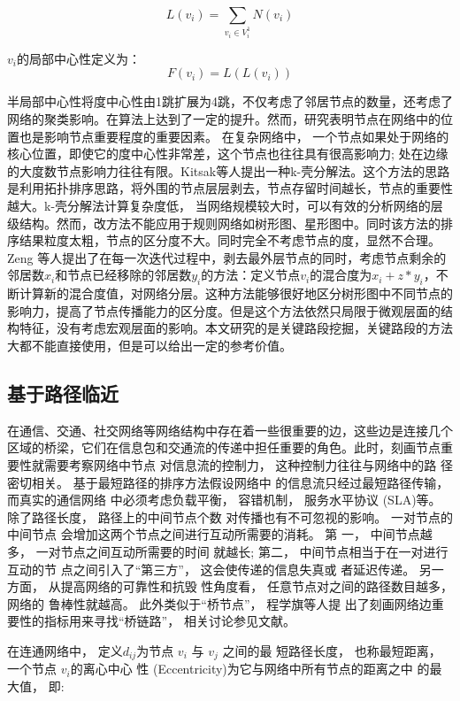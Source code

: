 		$$L(v_i)=\sum\limits_{v_i \in V_i^1} N(v_i)$$

		$v_i$的局部中心性定义为：
			$$F(v_i)=L(L(v_i))$$

		半局部中心性将度中心性由1跳扩展为4跳，不仅考虑了邻居节点的数量，还考虑了网络的聚类影响。在算法上达到了一定的提升。然而，研究表明节点在网络中的位置也是影响节点重要程度的重要因素。 在复杂网络中， 一个节点如果处于网络的核心位置，即使它的度中心性非常差，这个节点也往往具有很高影响力; 处在边缘的大度数节点影响力往往有限。Kitsak等人提出一种k-壳分解法\parencite{Kitsak2010Identification}。这个方法的思路是利用拓扑排序思路，将外围的节点层层剥去，节点存留时间越长，节点的重要性越大。k-壳分解法计算复杂度低， 当网络规模较大时，可以有效的分析网络的层级结构。然而，改方法不能应用于规则网络如树形图、星形图中。同时该方法的排序结果粒度太粗，节点的区分度不大。同时完全不考虑节点的度，显然不合理。Zeng 等人提出了在每一次迭代过程中，剥去最外层节点的同时，考虑节点剩余的邻居数$x_i$和节点已经移除的邻居数$y_i$的方法\parencite{Zeng2012Ranking}：定义节点$v_i$的混合度为$x_i+z*y_i$，不断计算新的混合度值，对网络分层。这种方法能够很好地区分树形图中不同节点的影响力，提高了节点传播能力的区分度。但是这个方法依然只局限于微观层面的结构特征，没有考虑宏观层面的影响。本文研究的是关键路段挖掘，关键路段的方法大都不能直接使用，但是可以给出一定的参考价值。
			

	\subsection{基于路径临近}
		在通信、交通、社交网络等网络结构中存在着一些很重要的边，这些边是连接几个区域的桥梁，它们在信息包和交通流的传递中担任重要的角色。此时，刻画节点重要性就需要考察网络中节点 对信息流的控制力， 这种控制力往往与网络中的路 径密切相关。 基于最短路径的排序方法假设网络中 的信息流只经过最短路径传输， 而真实的通信网络 中必须考虑负载平衡， 容错机制， 服务水平协议 (SLA)等\parencite{Dolev2010Routing}。 除了路径长度， 路径上的中间节点个数 对传播也有不可忽视的影响。 一对节点的中间节点 会增加这两个节点之间进行互动所需要的消耗。 第 一， 中间节点越多， 一对节点之间互动所需要的时间 就越长; 第二， 中间节点相当于在一对进行互动的节 点之间引入了“第三方”， 这会使传递的信息失真或 者延迟传递。 另一方面， 从提高网络的可靠性和抗毁 性角度看， 任意节点对之间的路径数目越多， 网络的 鲁棒性就越高。 此外类似于“桥节点”， 程学旗等人提 出了刻画网络边重要性的指标用来寻找“桥链路”， 相关讨论参见文献\parencite{Cheng2010Bridgeness}。

	在连通网络中， 定义$d_{ij}$为节点 $v_i$ 与 $v_j$ 之间的最 短路径长度， 也称最短距离， 一个节点 $v_i$的离心中心 性 (Eccentricity)为它与网络中所有节点的距离之中 的最大值\parencite{Hage1995Eccentricity}， 即:

